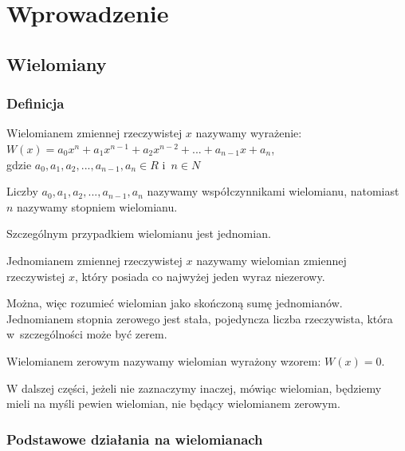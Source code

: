 \chapter{Wprowadzenie}

\section{Wielomiany}

\subsection{Definicja}

\begin{definition}
	$ $\\
	Wielomianem zmiennej rzeczywistej $x$ nazywamy wyrażenie: \\
	$W(x) = a_0x^n + a_1x^{n-1} + a_2x^{n-2}+ ... + a_{n-1}x + a_n$, \\
	gdzie $a_0, a_1, a_2, ..., a_{n-1}, a_n\in R$ i~$n \in N$
\end{definition}

Liczby $a_0, a_1, a_2, ..., a_{n-1}, a_n$ nazywamy współczynnikami wielomianu, natomiast $n$ nazywamy stopniem wielomianu.

Szczególnym przypadkiem wielomianu jest jednomian. 

\begin{definition}
	$ $\\
	Jednomianem zmiennej rzeczywistej $x$ nazywamy wielomian zmiennej rzeczywistej $x$, który posiada co najwyżej jeden wyraz niezerowy.
\end{definition}

Można, więc rozumieć wielomian jako skończoną sumę jednomianów.
Jednomianem stopnia zerowego jest stała, pojedyncza liczba rzeczywista, która w~szczególności może być zerem.

\begin{definition}
	$ $\\
	Wielomianem zerowym nazywamy wielomian wyrażony wzorem:	$W(x) = 0$.
\end{definition}

W dalszej części, jeżeli nie zaznaczymy inaczej, mówiąc wielomian, będziemy mieli na myśli pewien wielomian, nie będący wielomianem zerowym.

\subsection{Podstawowe działania na wielomianach}

